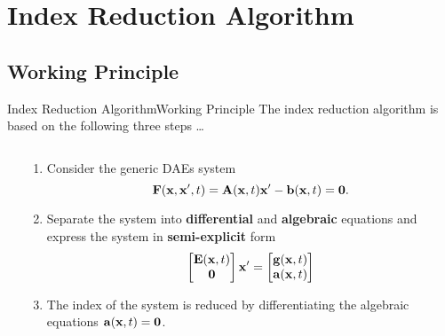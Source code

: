 
\section{Index Reduction Algorithm}

\subsection{Working Principle}

\begin{frame}{Index Reduction Algorithm}{Working Principle}
  The index reduction algorithm is based on the following three steps \dots
  \begin{columns}
    \begin{column}[c]{0.2\textwidth}
      \flushright
      \vspace{-2.5em}%
    \end{column}
    \begin{column}[c]{0.85\textwidth}
      \begin{enumerate}[<+->]
        \item Consider the generic \acp{DAE} system
        \begin{equation*}
          \mathbf{F}(\mathbf{x}, \mathbf{x}^\prime, t) = \mathbf{A}(\mathbf{x}, t) \mathbf{x}^\prime - \mathbf{b}(\mathbf{x}, t) = \mathbf{0} \text{.}
        \end{equation*}
        \item Separate the system into \textbf{differential} and \textbf{algebraic} equations and express the system in \textbf{semi-explicit} form
        \begin{equation*}
          \begin{bmatrix} \mathbf{E}(\mathbf{x}, t) \\ \mathbf{0} \end{bmatrix} \mathbf{x}^\prime = \begin{bmatrix} \mathbf{g}(\mathbf{x}, t) \\ \mathbf{a}(\mathbf{x}, t) \end{bmatrix}
        \end{equation*}
        \item The index of the system is reduced by differentiating the algebraic equations $\mathbf{a}(\mathbf{x}, t) = \mathbf{0}$.
      \end{enumerate}
    \end{column}
  \end{columns}
  \vspace{0.75em}
\end{frame}

